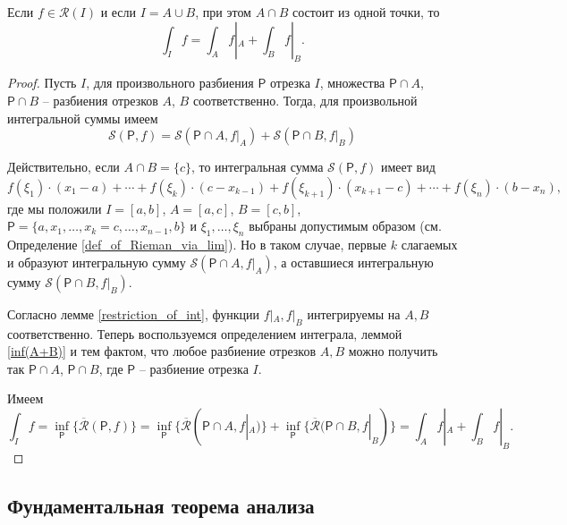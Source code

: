 \begin{theorem}\label{additive_of_int}
    Если $f \in\mathscr{R}(I)$ и если $I = A \cup B$, при этом $A\cap B$ состоит из одной точки, то
    \[
     \int_I f = \int_A f|_A + \int_B f|_B.
    \]
\end{theorem}

\begin{proof}
 Пусть $I$, для произвольного разбиения $\mathsf{P}$ отрезка $I$, множества $\mathsf{P}\cap A$, $\mathsf{P}\cap B$ -- разбиения отрезков $A$, $B$ соответственно. Тогда, для произвольной интегральной суммы имеем
 \[
  \mathcal{S}(\mathsf{P},f) = \mathcal{S}(\mathsf{P}\cap A, f|_A) + \mathcal{S}(\mathsf{P}\cap B, f|_B)
 \]

 Действительно, если $A \cap B = \{c\}$, то интегральная сумма $\mathcal{S}(\mathsf{P},f)$ имеет вид
 \[
  f(\xi_1)\cdot (x_1- a) + \cdots + f(\xi_k)\cdot (c-x_{k-1}) + f(\xi_{k+1})\cdot (x_{k+1}-c) + \cdots + f(\xi_n)\cdot(b-x_n),
 \]
 где мы положили $I = [a,b]$, $A = [a,c]$, $B=[c,b]$, $\mathsf{P} = \{a, x_1,\ldots, x_k=c, \ldots, x_{n-1},b\}$ и $\xi_1,\ldots, \xi_n$ выбраны допустимым образом (см. Определение \ref{def_of_Rieman_via_lim}). Но в таком случае, первые $k$ слагаемых и образуют интегральную сумму $\mathcal{S}(\mathsf{P}\cap A, f|_A)$, а оставшиеся интегральную сумму $\mathcal{S}(\mathsf{P}\cap B, f|_B)$.

Согласно лемме \ref{restriction_of_int}, функции $f|_A, f|_B$ интегрируемы на $A,B$ соответственно. Теперь воспользуемся определением интеграла, леммой \ref{inf(A+B)} и тем фактом, что любое разбиение отрезков $A,B$ можно получить так $\mathsf{P}\cap A$, $\mathsf{P}\cap B$, где $\mathsf{P}$ -- разбиение отрезка $I.$

 Имеем
 \[
  \int_I f = \inf_\mathsf{P}\{ \overline{\mathcal{R}}(\mathsf{P},f) \} = \inf_\mathsf{P}\{ \overline{\mathcal{R}}(\mathsf{P}\cap A,f|_A) \} + \inf_\mathsf{P}\{ \overline{\mathcal{R}}(\mathsf{P}\cap B,f|_B) \} = \int_A f|_A + \int_B f|_B. 
 \]
\end{proof}


\subsection{Фундаментальная теорема анализа}




